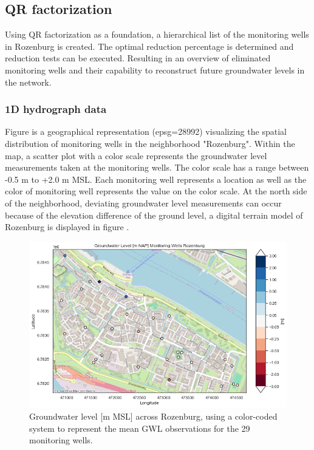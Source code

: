 \clearpage

\subsection{QR factorization}
Using QR factorization as a foundation, a hierarchical list of the monitoring wells in Rozenburg is created. The optimal reduction percentage is determined and reduction tests can be executed. Resulting in an overview of eliminated monitoring wells and their capability to reconstruct future groundwater levels in the network.

\subsubsection{1D hydrograph data}
Figure  is a geographical representation (epsg=28992) visualizing the spatial distribution of monitoring wells in the neighborhood "Rozenburg". Within the map, a scatter plot with a color scale represents the groundwater level measurements taken at the monitoring wells. The color scale has a range between -0.5 m to +2.0 m MSL. Each monitoring well represents a location as well as the color of monitoring well represents the value on the color scale. At the north side of the neighborhood, deviating groundwater level measurements can occur because of the elevation difference of the ground level, a digital terrain model of Rozenburg is displayed in figure .
\begin{figure}[htbp]
    \centering
    \includegraphics[width=0.80\linewidth]{frontmatter/Rozenburg-fig/gwlroz.png}
    \caption{Groundwater level [m MSL] across Rozenburg, using a color-coded system to represent the mean GWL observations for the 29 monitoring wells. }
    \label{gwlroz}
    
\end{figure}


